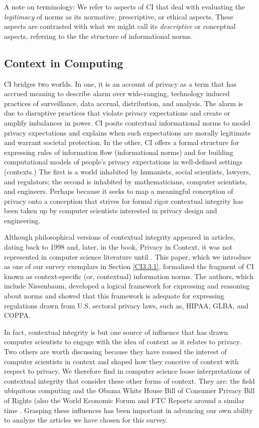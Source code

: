 \documentclass[../thesis.tex]{subfiles}
\begin{document}
A note on terminology: We refer to aspects of CI that deal with
evaluating the \textit{legitimacy} of norms as its normative,
prescriptive, or ethical aspects. These aspects are contrasted with
what we might call its \textit{descriptive} or conceptual aspects,
referring to the the structure of informational norms.


\subsection{Context in Computing}
\label{CI2.2}

CI bridges two worlds. In one, it is an account of
privacy as a term that has accrued meaning to describe alarm over
wide-ranging, technology induced practices of surveillance, data
accrual, distribution, and analysis. The alarm is due to disruptive
practices that violate privacy expectations and create or amplify
imbalances in power. CI posits contextual informational norms to model
privacy expectations and explains when such expectations are morally
legitimate and warrant societal protection. In the other, CI offers a
formal structure for expressing rules of information flow
(informational norms) and for building computational models of
people's privacy expectations in well-defined settings
(contexts.) The first is a world inhabited by humanists, social
scientists, lawyers, and regulators; the second is inhabited by
mathematicians, computer scientists, and engineers. Perhaps because it
seeks to map a meaningful conception of privacy onto a conception
that strives for formal rigor contextual integrity has been taken up by
computer scientists interested in privacy design and engineering. 

Although philosophical versions of contextual
integrity appeared in articles, dating back to 1998
\citep{nissenbaum1998protecting}
and, later, in the book, Privacy in Context, it was not represented in
computer science literature until \citet{barth06sp}. This paper,
which we introduce as one of our survey exemplars in
Section \ref{CI3.3.1},
formalized the fragment of CI known as context-specific (or,
contextual) information norms. The authors, which include Nissenbaum,
developed a logical framework for expressing and reasoning about norms
and showed that this framework is adequate for expressing regulations
drawn from U.S. sectoral privacy laws, such as, HIPAA, GLBA, and COPPA.

In fact, contextual integrity is but one source of influence that has
drawn computer scientists to engage with the idea of context as it
relates to privacy. Two others are worth discussing because they have
roused the interest of computer scientists in context and shaped how
they conceive of context with respect to privacy. We therefore find in
computer science loose interpretations of contextual integrity that
consider these other forms of context. They are: the field ubiquitous
computing and the Obama White House Bill of Consumer Privacy Bill of
Rights \cite{house2012consumer} (also the World Economic Forum and FTC
Reports around a similar time \citep{wef2012rethinking, federalprotecting}.
Grasping these influences has been important in advancing our own
ability to analyze the articles we have chosen for this survey.
\end{document}
